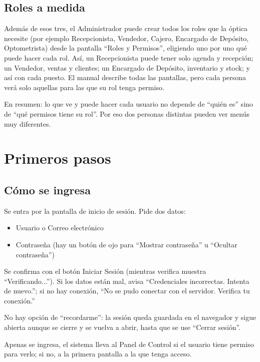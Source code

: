 \subsection{Roles a medida}
\label{sec:mu-roles-medida}

Además de esos tres, el Administrador puede crear todos los roles que la óptica necesite (por ejemplo Recepcionista, Vendedor, Cajero, Encargado de Depósito, Optometrista) desde la pantalla ``Roles y Permisos'', eligiendo uno por uno qué puede hacer cada rol. Así, un Recepcionista puede tener solo agenda y recepción; un Vendedor, ventas y clientes; un Encargado de Depósito, inventario y stock; y así con cada puesto. El manual describe todas las pantallas, pero cada persona verá solo aquellas para las que su rol tenga permiso.

En resumen: lo que ve y puede hacer cada usuario no depende de ``quién es'' sino de ``qué permisos tiene su rol''. Por eso dos personas distintas pueden ver menús muy diferentes.

\section{Primeros pasos}
\label{sec:mu-primeros-pasos}

\subsection{Cómo se ingresa}
\label{sec:mu-como-ingresa}

Se entra por la pantalla de inicio de sesión. Pide dos datos:

\begin{itemize}
  \item Usuario o Correo electrónico
  \item Contraseña (hay un botón de ojo para ``Mostrar contraseña'' u ``Ocultar contraseña'')
\end{itemize}

Se confirma con el botón Iniciar Sesión (mientras verifica muestra ``Verificando...''). Si los datos están mal, avisa ``Credenciales incorrectas. Intenta de nuevo.''; si no hay conexión, ``No se pudo conectar con el servidor. Verifica tu conexión.''

No hay opción de ``recordarme'': la sesión queda guardada en el navegador y sigue abierta aunque se cierre y se vuelva a abrir, hasta que se use ``Cerrar sesión''.

Apenas se ingresa, el sistema lleva al Panel de Control si el usuario tiene permiso para verlo; si no, a la primera pantalla a la que tenga acceso.

